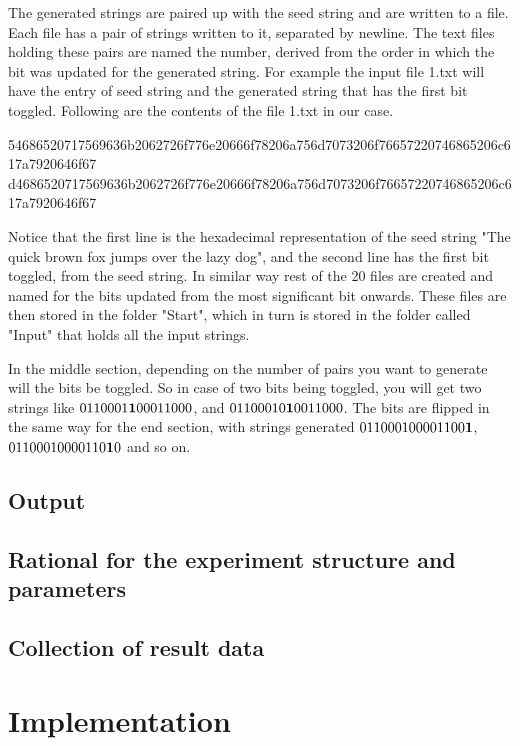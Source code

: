 The generated strings are paired up with the seed string and are written to a file. Each file has a pair of
strings written to it, separated by newline. The text files holding these pairs are named the number, derived
from the order in which the bit was updated for the generated string. For example the input file 1.txt will
have the entry of seed string and the generated string that has the first bit toggled. Following are the contents
of the file 1.txt in our case.

\begin{center}54686520717569636b2062726f776e20666f78206a756d7073206f76657220746865206c617a7920646f67
d4686520717569636b2062726f776e20666f78206a756d7073206f76657220746865206c617a7920646f67\end{center}

Notice that the first line is the hexadecimal representation of the seed string "The quick brown fox jumps over
the lazy dog", and the second line has the first bit toggled, from the seed string. In similar way rest of the 
20 files are created and named for the bits updated from the most significant bit onwards. These files are then
stored in the folder "Start", which in turn is stored in the folder called "Input" that holds all the input strings.

In the 
middle section, depending on the number of pairs you want to generate will the bits be toggled. So in case of 
two bits being toggled, you will get two strings like $0110001{\bf 1} 00011000$, and $01100010 {\bf 1}0011000$. 
The bits are flipped in the same way for the end section, with strings generated $01100010 0001100{\bf 1}$,
$01100010 000110{\bf 1}0$ and so on.

\subsection{Output}

\subsection{Rational for the experiment structure and parameters}

\subsection{Collection of result data}

\section{Implementation}

